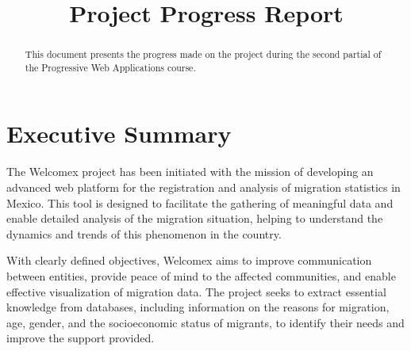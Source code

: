 \documentclass[conference]{IEEEtran}
\begin{document}
\title{Project Progress Report}

\author{
\and
{}
\and
{}
\and
{}
\and
{}
}

\maketitle
\begin{abstract}
    This document presents the progress made on the project during the second partial of the Progressive Web Applications course.
\end{abstract}


\section{Executive Summary}
The Welcomex project has been initiated with the mission of developing an advanced web platform for the registration and analysis of migration statistics in Mexico. This tool is designed to facilitate the gathering of meaningful data and enable detailed analysis of the migration situation, helping to understand the dynamics and trends of this phenomenon in the country.

With clearly defined objectives, Welcomex aims to improve communication between entities, provide peace of mind to the affected communities, and enable effective visualization of migration data. The project seeks to extract essential knowledge from databases, including information on the reasons for migration, age, gender, and the socioeconomic status of migrants, to identify their needs and improve the support provided.
\end{document}
